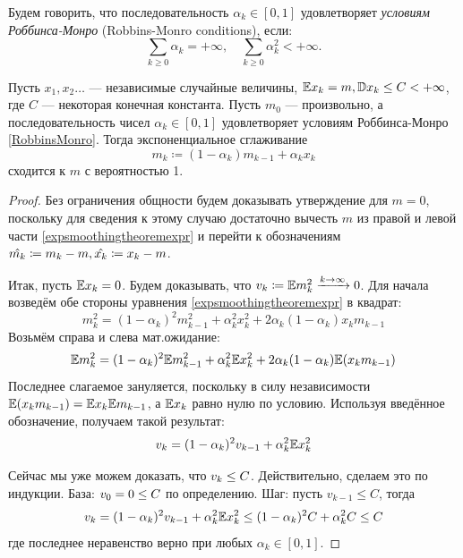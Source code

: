 \begin{definition}
Будем говорить, что последовательность $\alpha_k \in [0, 1]$ удовлетворяет \emph{условиям Роббинса-Монро} (Robbins-Monro conditions), если:
\begin{equation}\label{RobbinsMonro}
\sum_{k \ge 0} \alpha_k = +\infty, \quad \sum_{k \ge 0} \alpha_k^2 < +\infty.
\end{equation}
\end{definition}

\begin{theoremBox}[label=th:expsmoothingconvergence]{}
Пусть $x_1, x_2 \dots$ --- независимые случайные величины, $\mathbb{E} x_k = m, \mathbb{D} x_k \le C < +\infty$, где $C$ --- некоторая конечная константа. Пусть $m_0$ --- произвольно, а последовательность чисел $\alpha_k \in [0, 1]$ удовлетворяет условиям Роббинса-Монро \eqref{RobbinsMonro}. Тогда экспоненциальное сглаживание 
\begin{equation}\label{expsmoothingtheoremexpr}
m_k \coloneqq (1 - \alpha_k) m_{k-1} + \alpha_k x_k
\end{equation}
сходится к $m$ с вероятностью 1.
\begin{proof}
Без ограничения общности будем доказывать утверждение для $m = 0$, поскольку для сведения к этому случаю достаточно вычесть $m$ из правой и левой части \eqref{expsmoothingtheoremexpr} и перейти к обозначениям $\hat{m_k} \HM\coloneqq m_k - m, \hat{x_k} \HM\coloneqq x_k \HM- m$.

Итак, пусть $\E x_k \HM= 0$. Будем доказывать, что $v_k \HM\coloneqq \E m_k^2 \xrightarrow{k \to \infty} 0$. Для начала возведём обе стороны уравнения \eqref{expsmoothingtheoremexpr} в квадрат:
$$m_{k}^2 = (1 - \alpha_k)^2 m^2_{k-1} + \alpha^2_k x^2_k + 2\alpha_k(1 - \alpha_k)x_km_{k-1}$$
Возьмём справа и слева мат.ожидание:
$$\mathbb{E} m_{k}^2 = (1 - \alpha_k)^2 \mathbb{E} m^2_{k-1} + \alpha^2_k \mathbb{E} x^2_k + 2\alpha_k(1 - \alpha_k)\mathbb{E} (x_k m_{k-1})$$
Последнее слагаемое зануляется, поскольку в силу независимости $\E (x_k m_{k-1}) \HM= \E x_k \E m_{k-1}$, а $\mathbb{E} x_k$ равно нулю по условию. Используя введённое обозначение, получаем такой результат:
\begin{equation}\label{recurrentdispersion}
v_{k} = (1 - \alpha_k)^2 v_{k-1} + \alpha_k^2 \mathbb{E} x_k^2
\end{equation}

Сейчас мы уже можем доказать, что $v_k \HM\le C$. Действительно, сделаем это по индукции. База: $v_0 \HM= 0 \HM\le C$ по определению. Шаг: пусть $v_{k-1} \le C$, тогда
$$v_{k} = (1 - \alpha_k)^2 v_{k-1} + \alpha_k^2 \mathbb{E} x_k^2 \le (1 - \alpha_k)^2 C + \alpha_k^2 C \le C$$
где последнее неравенство верно при любых $\alpha_k \in [0, 1]$.


\end{proof}
\end{theoremBox}
